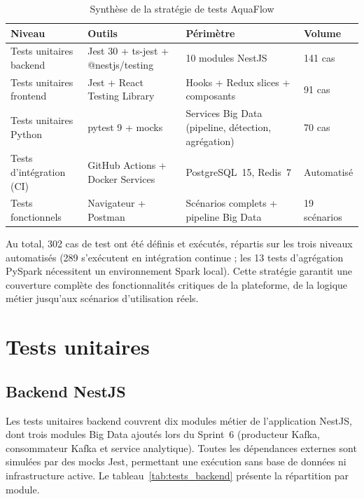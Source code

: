 \begin{table}[H]
	\centering
	\renewcommand{\arraystretch}{1.3}
	\caption{Synthèse de la stratégie de tests AquaFlow}
	\begin{tabular}{|p{4cm}|p{4.8cm}|p{3.4cm}|p{2.2cm}|}
		\hline
		\textbf{Niveau} & \textbf{Outils} & \textbf{Périmètre} & \textbf{Volume} \\
		\hline
		Tests unitaires backend
		& Jest 30 + ts-jest + @nestjs/testing
		& 10 modules NestJS
		& 141 cas \\
		\hline
		Tests unitaires frontend
		& Jest + React Testing Library
		& Hooks + Redux slices + composants
		& 91 cas \\
		\hline
		Tests unitaires Python
		& pytest 9 + mocks
		& Services Big Data (pipeline, détection, agrégation)
		& 70 cas \\
		\hline
		Tests d'intégration (CI)
		& GitHub Actions + Docker Services
		& PostgreSQL~15, Redis~7
		& Automatisé \\
		\hline
		Tests fonctionnels
		& Navigateur + Postman
		& Scénarios complets + pipeline Big Data
		& 19 scénarios \\
		\hline
	\end{tabular}
	\label{tab:strategie_tests}
\end{table}

Au total, 302 cas de test ont été définis et exécutés, répartis sur les trois niveaux
automatisés (289 s'exécutent en intégration continue ; les 13 tests d'agrégation PySpark
nécessitent un environnement Spark local). Cette stratégie garantit une couverture complète
des fonctionnalités critiques de la plateforme, de la logique métier jusqu'aux scénarios
d'utilisation réels.

\section{Tests unitaires}

\subsection{Backend NestJS}

Les tests unitaires backend couvrent dix modules métier de l'application NestJS,
dont trois modules Big Data ajoutés lors du Sprint~6 (producteur Kafka, consommateur Kafka
et service analytique). Toutes les dépendances externes sont simulées par des mocks Jest,
permettant une exécution sans base de données ni infrastructure active.
Le tableau~\ref{tab:tests_backend} présente la répartition par module.

